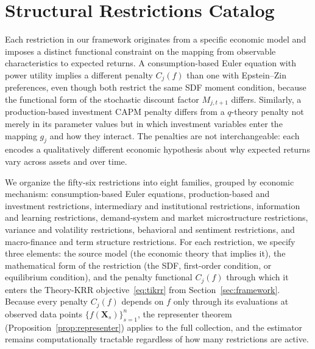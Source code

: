
\section{Structural Restrictions Catalog}\label{sec:restrictions}

Each restriction in our framework originates from a specific economic model and imposes a distinct functional constraint on the mapping from observable characteristics to expected returns.
A consumption-based Euler equation with power utility implies a different penalty $C_j(f)$ than one with Epstein--Zin preferences, even though both restrict the same SDF moment condition, because the functional form of the stochastic discount factor $M_{j,t+1}$ differs.
Similarly, a production-based investment CAPM penalty differs from a $q$-theory penalty not merely in its parameter values but in which investment variables enter the mapping $g_j$ and how they interact.
The penalties are not interchangeable: each encodes a qualitatively different economic hypothesis about why expected returns vary across assets and over time.

We organize the fifty-six restrictions into eight families, grouped by economic mechanism: consumption-based Euler equations, production-based and investment restrictions, intermediary and institutional restrictions, information and learning restrictions, demand-system and market microstructure restrictions, variance and volatility restrictions, behavioral and sentiment restrictions, and macro-finance and term structure restrictions.
For each restriction, we specify three elements: the source model (the economic theory that implies it), the mathematical form of the restriction (the SDF, first-order condition, or equilibrium condition), and the penalty functional $C_j(f)$ through which it enters the Theory-KRR objective~\eqref{eq:tikrr} from Section~\ref{sec:framework}.
Because every penalty $C_j(f)$ depends on $f$ only through its evaluations at observed data points $\{f(\mathbf{X}_s)\}_{s=1}^n$, the representer theorem (Proposition~\ref{prop:representer}) applies to the full collection, and the estimator remains computationally tractable regardless of how many restrictions are active.



